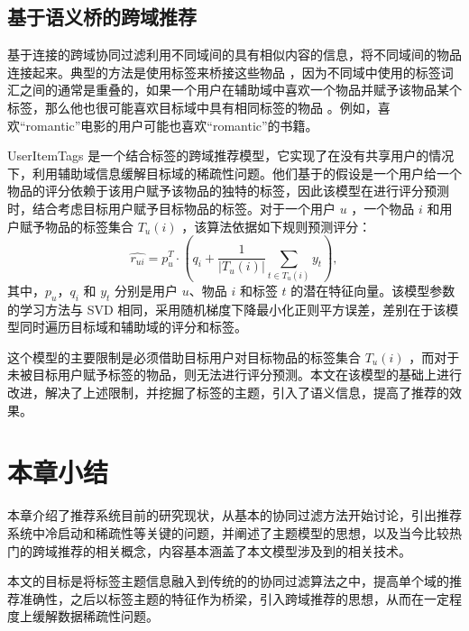 \subsection{基于语义桥的跨域推荐}
基于连接的跨域协同过滤利用不同域间的具有相似内容的信息，将不同域间的物品连接起来。典型的方法是使用标签来桥接这些物品 \cite{Enrich2013Cold,chen2016capturing}，因为不同域中使用的标签词汇之间的通常是重叠的\cite{项亮2012推荐系统实践}，如果一个用户在辅助域中喜欢一个物品并赋予该物品某个标签，那么他也很可能喜欢目标域中具有相同标签的物品 \cite{Xin2015Cross}。例如，喜欢“romantic”电影的用户可能也喜欢“romantic”的书籍。

UserItemTags  \cite{shi2011tags}是一个结合标签的跨域推荐模型，它实现了在没有共享用户的情况下，利用辅助域信息缓解目标域的稀疏性问题。他们基于的假设是一个用户给一个物品的评分依赖于该用户赋予该物品的独特的标签，因此该模型在进行评分预测时，结合考虑目标用户赋予目标物品的标签。对于一个用户 $u$ ，一个物品 $i$ 和用户赋予物品的标签集合 $T_u(i)$ ，该算法依据如下规则预测评分：
\begin{equation}
\hat{r_{ui}} = p_u^T \cdot (q_i + \frac{1}{|T_u(i)|}  \sum\limits_{t  \in T_u(i)} {y_t}  ),
\end{equation}
其中，$p_u$，$q_i$ 和 $y_t$ 分别是用户 $u$、物品 $i$ 和标签 $t$ 的潜在特征向量。该模型参数的学习方法与 SVD 相同，采用随机梯度下降最小化正则平方误差，差别在于该模型同时遍历目标域和辅助域的评分和标签。

这个模型的主要限制是必须借助目标用户对目标物品的标签集合 $T_u(i)​$ ，而对于未被目标用户赋予标签的物品，则无法进行评分预测。本文在该模型的基础上进行改进，解决了上述限制，并挖掘了标签的主题，引入了语义信息，提高了推荐的效果。

\section{本章小结}

本章介绍了推荐系统目前的研究现状，从基本的协同过滤方法开始讨论，引出推荐系统中冷启动和稀疏性等关键的问题，并阐述了主题模型的思想，以及当今比较热门的跨域推荐的相关概念，内容基本涵盖了本文模型涉及到的相关技术。

本文的目标是将标签主题信息融入到传统的的协同过滤算法之中，提高单个域的推荐准确性，之后以标签主题的特征作为桥梁，引入跨域推荐的思想，从而在一定程度上缓解数据稀疏性问题。


